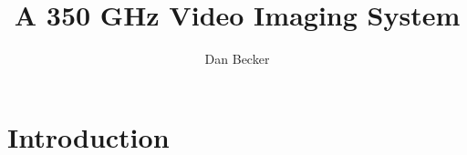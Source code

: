 \documentclass[10pt,twocolumn,article]{memoir}
\title{A 350 GHz Video Imaging System}
\author{Dan Becker}
\begin{document}
\maketitle




\chapter{Introduction}\label{c:intro}

\end{document}
